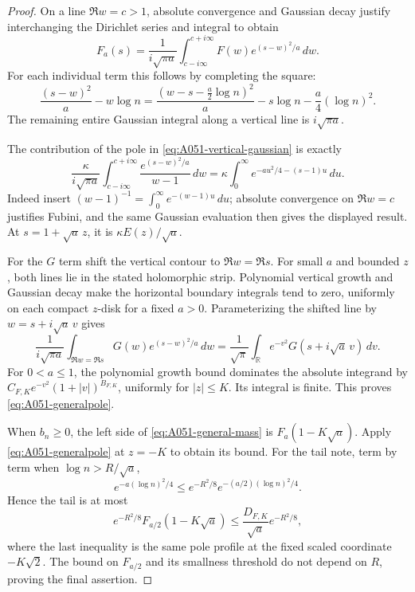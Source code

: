 \begin{proof}
On a line \(\Re w=c>1\), absolute convergence and Gaussian decay
justify interchanging the Dirichlet series and integral to obtain
\begin{equation}\label{eq:A051-vertical-gaussian}
 F_a(s)=\frac1{i\sqrt{\pi a}}
                  \int_{c-i\infty}^{c+i\infty}
                      F(w)e^{(s-w)^2/a}\,dw.
\end{equation}
For each individual term this follows by completing the square:
\[
 \frac{(s-w)^2}{a}-w\log n
    =\frac{(w-s-\frac a2\log n)^2}{a}
                                  -s\log n-\frac a4(\log n)^2.
\]
The remaining entire Gaussian integral along a vertical line is
\(i\sqrt{\pi a}\).

The contribution of the pole in \eqref{eq:A051-vertical-gaussian}
is exactly
\[
 \frac\kappa{i\sqrt{\pi a}}
     \int_{c-i\infty}^{c+i\infty}
            \frac{e^{(s-w)^2/a}}{w-1}\,dw
       =\kappa\int_0^\infty
               e^{-a u^2/4-(s-1)u}\,du.
\]
Indeed insert \((w-1)^{-1}=\int_0^\infty e^{-(w-1)u}\,du\);
absolute convergence on \(\Re w=c\) justifies Fubini, and the
same Gaussian evaluation then gives the displayed result.
At \(s=1+\sqrt a\,z\), it is \(\kappa E(z)/\sqrt a\).

For the \(G\) term shift the vertical contour to \(\Re w=\Re s\).
For small \(a\) and bounded \(z\), both lines lie in the stated
holomorphic strip. Polynomial vertical growth and Gaussian decay
make the horizontal boundary integrals tend to zero, uniformly
on each compact \(z\)-disk for a fixed \(a>0\).
Parameterizing the shifted line by \(w=s+i\sqrt a\,v\) gives
\begin{equation}\label{eq:A051-G-Gaussian}
 \frac1{i\sqrt{\pi a}}\int_{\Re w=\Re s}
                  G(w)e^{(s-w)^2/a}\,dw
         =\frac1{\sqrt\pi}\int_{\mathbb R}
                             e^{-v^2}G(s+i\sqrt a\,v)\,dv.
\end{equation}
For \(0<a\le1\), the polynomial growth bound dominates the
absolute integrand by
\(C_{F,K}e^{-v^2}(1+|v|)^{B_{F,K}}\), uniformly for \(|z|\le K\).
Its integral is finite. This proves \eqref{eq:A051-generalpole}.

When \(b_n\ge0\), the left side of
\eqref{eq:A051-general-mass} is \(F_a(1-K\sqrt a)\).
Apply \eqref{eq:A051-generalpole} at \(z=-K\) to obtain its bound.
For the tail note, term by term when \(\log n>R/\sqrt a\),
\[
 e^{-a(\log n)^2/4}
       \le e^{-R^2/8}e^{-(a/2)(\log n)^2/4}.
\]
Hence the tail is at most
\[
         e^{-R^2/8}F_{a/2}(1-K\sqrt a)
            \le \frac{D_{F,K}}{\sqrt a}e^{-R^2/8},
\]
where the last inequality is the same pole profile at the fixed
scaled coordinate \(-K\sqrt2\).
The bound on \(F_{a/2}\) and its smallness threshold do not depend
on \(R\), proving the final assertion.
\end{proof}


